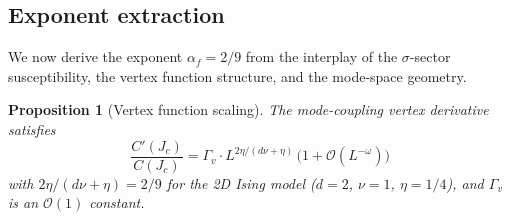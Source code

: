 \documentclass[11pt]{article}
\newtheorem{proposition}[theorem]{Proposition}
\theoremstyle{definition}
\theoremstyle{remark}
\newcommand{\Jc}{J_c}
\newcommand{\cO}{\mathcal{O}}
\begin{document}
\subsection{Exponent extraction}
\label{subsec:exponent-extraction}

We now derive the exponent $\alpha_f = 2/9$ from the
interplay of the $\sigma$-sector susceptibility, the
vertex function structure, and the mode-space geometry.

\begin{proposition}[Vertex function scaling]
\label{prop:vertex-scaling}
The mode-coupling vertex derivative satisfies
\begin{equation}
  \frac{C'(\Jc)}{C(\Jc)} = \Gamma_v \cdot
    L^{2\eta/(d\nu + \eta)}\,
    \bigl(1 + \cO(L^{-\omega})\bigr)
  \label{eq:vertex-scaling-prop}
\end{equation}
with $2\eta/(d\nu + \eta) = 2/9$ for the 2D Ising model
($d=2$, $\nu=1$, $\eta=1/4$), and $\Gamma_v$ is an
$\cO(1)$ constant.
\end{proposition}
\end{document}
